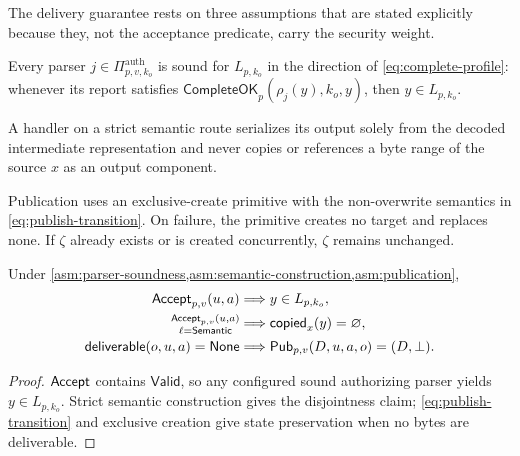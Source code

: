 The delivery guarantee rests on three assumptions that are stated explicitly
because they, not the acceptance predicate, carry the security weight.

\begin{assumption}
\label{asm:parser-soundness}
Every parser \(j\in\Pi^{\mathrm{auth}}_{p,v,k_o}\) is sound for
\(L_{p,k_o}\) in the direction of \cref{eq:complete-profile}: whenever its
report satisfies \(\mathsf{CompleteOK}_{p}(\rho_j(y),k_o,y)\), then
\(y\in L_{p,k_o}\).
\end{assumption}

\begin{assumption}
\label{asm:semantic-construction}
A handler on a strict semantic route serializes its output solely from the
decoded intermediate representation and never copies or references a byte range
of the source \(x\) as an output component.
\end{assumption}

\begin{assumption}
\label{asm:publication}
Publication uses an exclusive-create primitive with the non-overwrite semantics
in \cref{eq:publish-transition}. On failure, the primitive creates no target and
replaces none. If \(\zeta\) already exists or is created concurrently, \(\zeta\)
remains unchanged.
\end{assumption}

\begin{theorem}
\label{thm:conditional-delivery}
Under \cref{asm:parser-soundness,asm:semantic-construction,asm:publication},
\begin{equation}
\begin{aligned}
 \mathsf{Accept}_{p,v}(u,a)&\Longrightarrow y\in L_{p,k_o},\\
 \substack{\mathsf{Accept}_{p,v}(u,a)\\ \ell=\mathsf{Semantic}}&\Longrightarrow
   \mathsf{copied}_{x}(y)=\varnothing,\\
 \mathsf{deliverable}(o,u,a)=\mathsf{None}
   &\Longrightarrow \mathsf{Pub}_{p,v}(D,u,a,o)=(D,\bot).
\end{aligned}
\label{eq:conditional-delivery}
\end{equation}
\end{theorem}

\begin{proof}
\(\mathsf{Accept}\) contains \(\mathsf{Valid}\), so any configured sound authorizing
parser yields \(y\in L_{p,k_o}\). Strict semantic construction gives the
disjointness claim; \cref{eq:publish-transition} and exclusive creation give
state preservation when no bytes are deliverable.
\end{proof}


